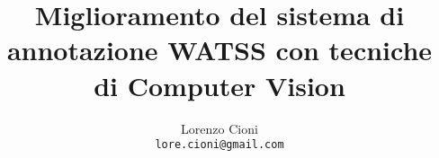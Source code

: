 \documentclass[10pt,twocolumn,letterpaper]{article}
\begin{document}
\title{Miglioramento del sistema di annotazione WATSS con tecniche di Computer Vision}

\author{Lorenzo Cioni\\
{\tt\small lore.cioni@gmail.com}}

\maketitle
\thispagestyle{empty}








{\small


}
\end{document}
